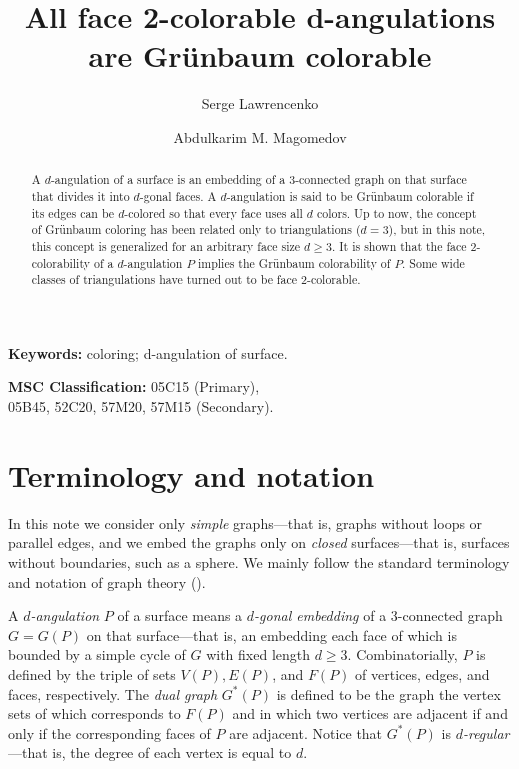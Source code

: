 \documentclass[12pt]{article}
\begin{document}
\title{All face 2-colorable d-angulations \\are Gr\"unbaum colorable}

\author{\Large{Serge Lawrencenko}}

\author{\Large{Abdulkarim M. Magomedov}}
\affil[]{}
\renewcommand\Authands{}
\maketitle

\begin{abstract}
A $d$-angulation of a surface is an embedding of a 3-connected graph on that surface that divides it into $d$-gonal faces. A $d$-angulation is said to be Gr\"unbaum colorable if its edges can be $d$-colored so that every face uses all $d$  colors. Up to now, the concept of Gr\"unbaum coloring has been related only to triangulations ($d = 3$),  but in this note, this concept is generalized for an arbitrary face size $d \geqslant 3$. It is shown that the face 2-colorability of a {$d\mbox{-}$angulation} $P$  implies the Gr\"unbaum colorability of $P$.  Some wide classes of triangulations have turned out to be face 2-colorable.  
\end{abstract}

{\bf Keywords:} coloring; d-angulation of surface.

{\bf MSC Classification:} 05C15 (Primary), \\ 
\hphantom{10 pt} \hphantom{10 pt} \hphantom{1 pt} \hphantom{1 pt} \hphantom{10 pt} 05B45, 52C20, 57M20, 57M15 (Secondary).

\section{Terminology and notation}
In this note we consider only {\it simple} graphs---that is, graphs without loops or parallel edges, and we embed the graphs only on {\it closed} surfaces---that is, surfaces without boundaries, such as a sphere. We mainly follow the standard terminology and notation of graph theory (\cite{H}). 

A {\it $d$-angulation} $P$  of a surface means a {\it $d$-gonal embedding} of a 3-connected graph $G=G(P)$  on that surface---that is, an embedding each face of which is bounded by a simple cycle of $G$ with fixed length 
$d \geqslant 3$.  Combinatorially, $P$  is defined by the triple of sets $V(P), E(P)$, and $F(P)$  of vertices, edges, and faces, respectively. The {\it dual graph} $G^*(P)$  is defined to be the graph the vertex sets of which corresponds to $F(P)$ and in which two vertices are adjacent if and only if the corresponding faces of $P$  are adjacent. Notice that $G^*(P)$ is {\it $d$-regular}---that is, the degree of each vertex is equal to $d$. 
\end{document}
